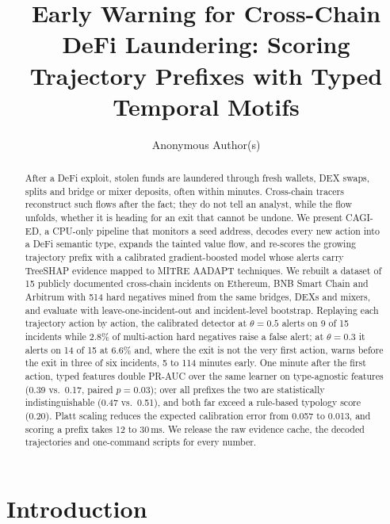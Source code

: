 \documentclass[runningheads]{llncs}
\newcommand{\1}{\mathbb{1}}
\begin{document}
\title{Early Warning for Cross-Chain DeFi Laundering: Scoring Trajectory Prefixes with Typed Temporal Motifs}
\author{Anonymous Author(s)}

\maketitle

\begin{abstract}
After a DeFi exploit, stolen funds are laundered through fresh wallets, DEX swaps, splits and bridge or mixer deposits, often within minutes.
Cross-chain tracers reconstruct such flows after the fact; they do not tell an analyst, while the flow unfolds, whether it is heading for an exit that cannot be undone.
We present CAGI-ED, a CPU-only pipeline that monitors a seed address, decodes every new action into a DeFi semantic type, expands the tainted value flow, and re-scores the growing trajectory prefix with a calibrated gradient-boosted model whose alerts carry TreeSHAP evidence mapped to MITRE AADAPT techniques.
We rebuilt a dataset of 15 publicly documented cross-chain incidents on Ethereum, BNB Smart Chain and Arbitrum with 514 hard negatives mined from the same bridges, DEXs and mixers, and evaluate with leave-one-incident-out and incident-level bootstrap.
Replaying each trajectory action by action, the calibrated detector at $\theta=0.5$ alerts on 9 of 15 incidents while 2.8\% of multi-action hard negatives raise a false alert; at $\theta=0.3$ it alerts on 14 of 15 at 6.6\% and, where the exit is not the very first action, warns before the exit in three of six incidents, 5 to 114 minutes early.
One minute after the first action, typed features double PR-AUC over the same learner on type-agnostic features (0.39 vs.\ 0.17, paired $p=0.03$); over all prefixes the two are statistically indistinguishable (0.47 vs.\ 0.51), and both far exceed a rule-based typology score (0.20).
Platt scaling reduces the expected calibration error from 0.057 to 0.013, and scoring a prefix takes 12 to 30\,ms.
We release the raw evidence cache, the decoded trajectories and one-command scripts for every number.
\end{abstract}

\section{Introduction}
\label{sec:intro}
\end{document}
